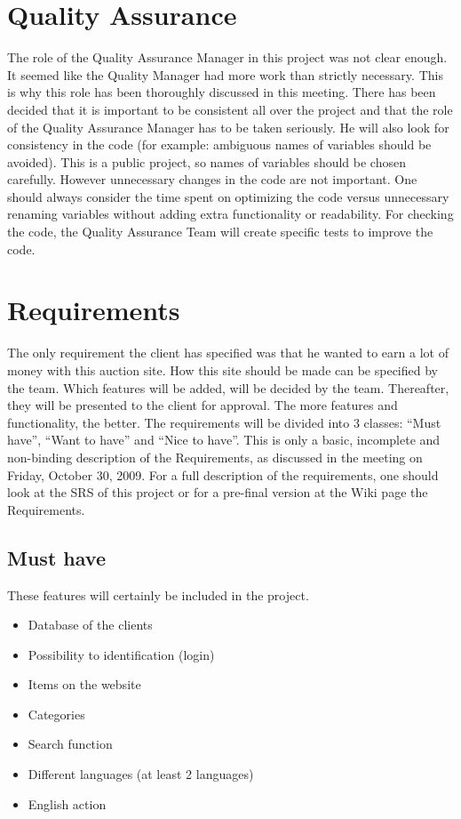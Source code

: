 \documentclass[a4paper, 12pt]{article}
\begin{document}
	\section{Quality Assurance}
The role of the Quality Assurance Manager in this project was not clear enough. It seemed like the Quality Manager had more work than strictly necessary. This is why this role has been thoroughly discussed in this meeting. There has been decided that it is important to be consistent all over the project and that the role of the Quality Assurance Manager has to be taken seriously. He will also look for consistency in the code (for example: ambiguous names of variables should be avoided). This is a public project, so names of variables should be chosen carefully. However unnecessary changes in the code are not important. One should always consider the time spent on optimizing the code versus unnecessary renaming variables without adding extra functionality or readability. For checking the code, the Quality Assurance Team will create specific tests to improve the code.
	\section{Requirements}
The only requirement the client has specified was that he wanted to earn a lot of money with this auction site. How this site should be made can be specified by the team. Which features will be added, will be decided by the team. Thereafter, they will be presented to the client for approval. The more features and functionality, the better.
The requirements will be divided into 3 classes: ``Must have'', ``Want to have''  and ``Nice to have''. This is only a basic, incomplete and non-binding description of the Requirements, as discussed in the meeting on Friday, October 30, 2009. For a full description of the requirements, one should look at the SRS of this project or for a pre-final version at the Wiki page the Requirements\cite{site2}.

		\subsection{Must have}
These features will certainly be included in the project.
			\begin{itemize}
				\item Database of the clients
				\item Possibility to identification (login)
				\item Items on the website
				\item Categories
				\item Search function
				\item Different languages (at least 2 languages)
				\item English action
			\end{itemize}
	
\end{document}
